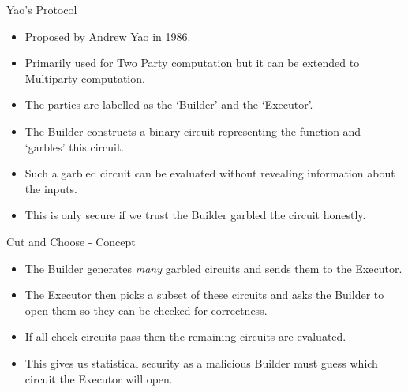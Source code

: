 \documentclass[t, 12pt]{beamer}            %
\begin{document}
\begin{frame}{Yao's Protocol}
	\begin{itemize} %
		\item Proposed by Andrew Yao in 1986.
		\item Primarily used for Two Party computation but it can be extended to Multiparty computation.
		\item The parties are labelled as the `Builder' and the `Executor'.
		\item The Builder constructs a binary circuit representing the function and `garbles' this circuit.
		\item Such a garbled circuit can be evaluated without revealing information about the inputs.
		\item This is only secure if we trust the Builder garbled the circuit honestly.
	\end{itemize}
\end{frame}


%	


\begin{frame}{Cut and Choose - Concept}
	\begin{itemize} %
		\item The Builder generates \emph{many} garbled circuits and sends them to the Executor.
		\item The Executor then picks a subset of these circuits and asks the Builder to open them so they can be checked for correctness.
		\item If all check circuits pass then the remaining circuits are evaluated.
		\item This gives us statistical security as a malicious Builder must guess which circuit the Executor will open.
	\end{itemize}
\end{frame}
\end{document}
